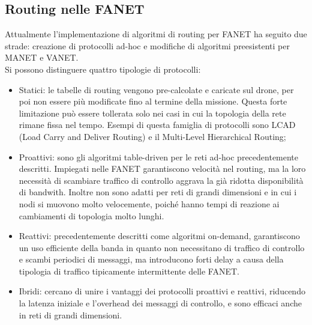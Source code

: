 \subsection[Routing nelle FANET]{Routing nelle FANET}
Attualmente l'implementazione di algoritmi di routing per FANET ha seguito due strade: creazione di protocolli ad-hoc e modifiche di algoritmi preesistenti per MANET e VANET. \\
Si possono distinguere quattro tipologie di protocolli:
\begin{itemize}
	\item Statici: le tabelle di routing vengono pre-calcolate e caricate sul drone, per poi non essere più modificate fino al termine della missione. Questa forte limitazione può essere tollerata solo nei casi in cui la topologia della rete rimane fissa nel tempo. Esempi di questa famiglia di protocolli sono LCAD (Load Carry and Deliver Routing) e il Multi-Level Hierarchical Routing;
	\item Proattivi: sono gli algoritmi table-driven per le reti ad-hoc precedentemente descritti. Impiegati nelle FANET garantiscono velocità nel routing, ma la loro necessità di scambiare traffico di controllo aggrava la già ridotta disponibilità di bandwith. Inoltre non sono adatti per reti di grandi dimensioni e in cui i nodi si muovono molto velocemente, poiché hanno tempi di reazione ai cambiamenti di topologia molto lunghi.
	\item Reattivi: precedentemente descritti come algoritmi on-demand, garantiscono un uso efficiente della banda in quanto non necessitano di traffico di controllo e scambi periodici di messaggi, ma introducono forti delay a causa della tipologia di traffico tipicamente intermittente delle FANET. 
	\item Ibridi: cercano di unire i vantaggi dei protocolli proattivi e reattivi, riducendo la latenza iniziale e l'overhead dei messaggi di controllo, e sono efficaci anche in reti di grandi dimensioni. 
\end{itemize}






